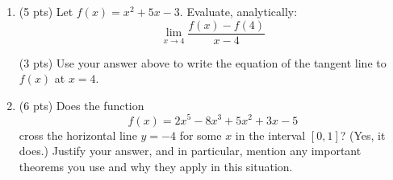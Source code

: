 \documentclass[11pt,letterpaper]{article}
\begin{document}
\begin{enumerate}
\newpage
\item (5 pts) Let $f(x)=x^2+5x-3$.  Evaluate, analytically:
\[\lim_{x\to 4}\frac{f(x)-f(4)}{x-4}\]

\vspace{20pc}
(3 pts) Use your answer above to write the equation of the tangent line to $f(x)$ at $x=4$.

\newpage
\item (6 pts) Does the function 
\[f(x)=2x^5-8x^3+5x^2+3x-5\] 
cross the horizontal line $y=-4$ for some $x$ in the interval $\left[0,1\right]$?  (Yes, it does.)  Justify your answer, and in particular, mention any important theorems you use and why they apply in this situation. 

\end{enumerate}
\end{document}

